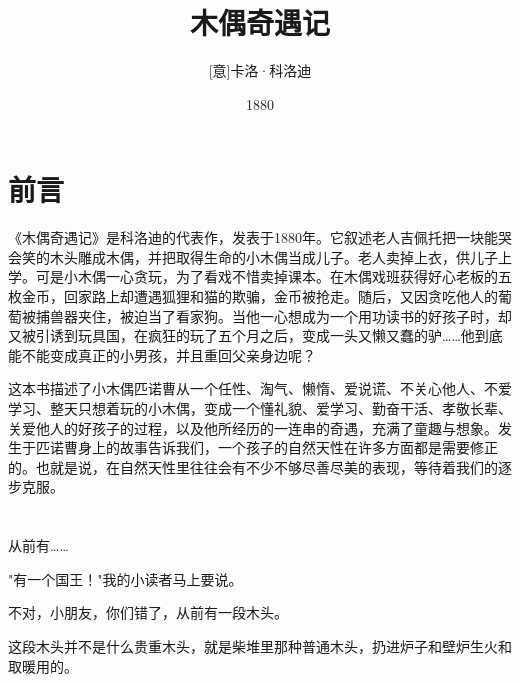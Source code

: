 \documentclass[12pt,UTF8]{ctexbook}
\title{\heiti\zihao{0} 木偶奇遇记}
\author{[意]卡洛·科洛迪}
\date{1880}
\begin{document}
\maketitle
\tableofcontents

\frontmatter

\chapter{前言}

《木偶奇遇记》是科洛迪的代表作，发表于1880年。它叙述老人吉佩托把一块能哭会笑的木头雕成木偶，并把取得生命的小木偶当成儿子。老人卖掉上衣，供儿子上学。可是小木偶一心贪玩，为了看戏不惜卖掉课本。在木偶戏班获得好心老板的五枚金币，回家路上却遭遇狐狸和猫的欺骗，金币被抢走。随后，又因贪吃他人的葡萄被捕兽器夹住，被迫当了看家狗。当他一心想成为一个用功读书的好孩子时，却又被引诱到玩具国，在疯狂的玩了五个月之后，变成一头又懒又蠢的驴……他到底能不能变成真正的小男孩，并且重回父亲身边呢？

这本书描述了小木偶匹诺曹从一个任性、淘气、懒惰、爱说谎、不关心他人、不爱学习、整天只想着玩的小木偶，变成一个懂礼貌、爱学习、勤奋干活、孝敬长辈、关爱他人的好孩子的过程，以及他所经历的一连串的奇遇，充满了童趣与想象。发生于匹诺曹身上的故事告诉我们，一个孩子的自然天性在许多方面都是需要修正的。也就是说，在自然天性里往往会有不少不够尽善尽美的表现，等待着我们的逐步克服。

\mainmatter

\chapter{}

从前有……

"有一个国王！"我的小读者马上要说。

不对，小朋友，你们错了，从前有一段木头。

这段木头并不是什么贵重木头，就是柴堆里那种普通木头，扔进炉子和壁炉生火和取暖用的。
\end{document}
